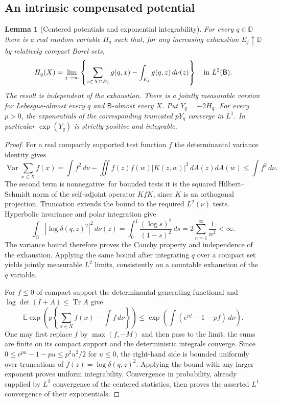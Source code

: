 \documentclass[11pt,a4paper]{article}
\numberwithin{equation}{section}
\newtheorem{lemma}[theorem]{Lemma}
\theoremstyle{definition}
\theoremstyle{remark}
\newcommand{\D}{\mathbb D}
\newcommand{\E}{\mathbb E}
\begin{document}
\subsection{An intrinsic compensated potential}

\begin{lemma}[Centered potentials and exponential integrability]
\label{lem:bergman-centered-potential}
For every $q\in\D$ there is a real random variable $H_q$ such that, for
any increasing exhaustion $E_j\uparrow\D$ by relatively compact Borel sets,
\begin{equation}
 H_q(X)=\lim_{j\to\infty}\left\{
   \sum_{x\in X\cap E_j}g(q,x)-\int_{E_j}g(q,z)\,d\nu(z)
 \right\}
 \quad\hbox{in }L^2(\mathsf B).
 \label{eq:bergman-centered-potential}
\end{equation}
The result is independent of the exhaustion.  There is a jointly
measurable version for Lebesgue-almost every $q$ and $\mathsf B$-almost
every $X$.  Put $Y_q=-2H_q$.  For every $p>0$, the exponentials of
the corresponding truncated $pY_q$ converge in $L^1$.  In particular
$\exp(Y_q)$ is strictly positive and integrable.
\end{lemma}

\begin{proof}
For a real compactly supported test function $f$ the determinantal
variance identity gives
\[
 \operatorname{Var}\sum_{x\in X}f(x)
 =\int f^2\,d\nu-
   \iint f(z)f(w)|K(z,w)|^2\,dA(z)dA(w)
 \leq\int f^2\,d\nu.
\]
The second term is nonnegative: for bounded tests it is the squared
Hilbert--Schmidt norm of the self-adjoint operator $KfK$, since $K$ is
an orthogonal projection.  Truncation extends the bound to the required
$L^2(\nu)$ tests.  Hyperbolic invariance and polar integration give
\[
 \int_\D |\log\delta(q,z)^2|^2\,d\nu(z)
 =\int_0^1\frac{(\log s)^2}{(1-s)^2}\,ds
 =2\sum_{n=1}^{\infty}\frac1{n^2}<\infty.
\]
The variance bound therefore proves the Cauchy property and independence
of the exhaustion.  Applying the same bound after integrating $q$ over
a compact set yields jointly measurable $L^2$ limits, consistently on a
countable exhaustion of the $q$ variable.

For $f\leq0$ of compact support the determinantal generating functional
and $\log\det(I+A)\leq\operatorname{Tr}A$ give
\begin{equation}
 \E\exp\left(p\left\{\sum_{x\in X}f(x)-\int f\,d\nu\right\}\right)
 \leq \exp\left(\int(e^{pf}-1-pf)\,d\nu\right).
 \label{eq:bergman-centered-exp-bound}
\end{equation}
One may first replace $f$ by $\max(f,-M)$ and then pass to the limit;
the sums are finite on its compact support and the deterministic
integrals converge.  Since $0\leq e^{pu}-1-pu\leq p^2u^2/2$ for
$u\leq0$, the right-hand side is bounded uniformly over truncations
of $f(z)=\log\delta(q,z)^2$.  Applying the bound with any larger
exponent proves uniform integrability.  Convergence in probability,
already supplied by $L^2$ convergence of the centered statistics,
then proves the asserted $L^1$ convergence of their exponentials.
\end{proof}
\end{document}
